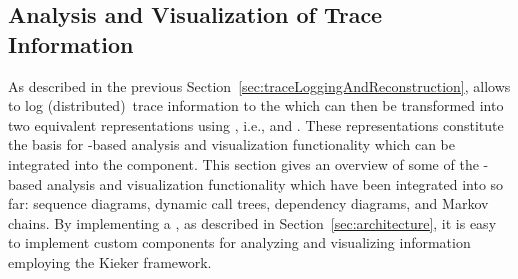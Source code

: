 % 
% 
% 
% 
\subsection{Analysis and Visualization of Trace Information}\label{sec:traceAnalysisAndVisualization}

\noindent As described in the previous Section~\ref{sec:traceLoggingAndReconstruction}, %
\KiekerTpmon{} allows to log (distributed)~trace information to the \MonitoringLog{} %
which can then be transformed into two equivalent \trace{} representations using %
\KiekerTpan{}, i.e., \executionTraces{} and \messageTraces{}. %
These representations constitute the basis for \trace{}-based analysis and 
visualization functionality which can be integrated into the \KiekerTpan{} %
component. %
This section gives an overview of some of the \trace{}-based analysis and visualization %
functionality which have been integrated into \KiekerTpan{} so far: sequence diagrams, dynamic call trees, dependency diagrams, and Markov chains. %
By implementing a \MonitoringRecordConsumer{}, as described in Section~\ref{sec:architecture}, %
it is easy to implement custom components for analyzing and visualizing \trace{} %
information employing the Kieker framework.

%
% 

